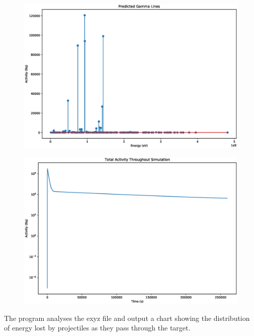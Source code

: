 \documentclass[12pt,twoside]{manual}
\begin{document}
\begin{figure}[h]
  \begin{center}
    \includegraphics[scale=0.25]{img/end_of_sim_gamma_lines.eps}
  \end{center}
\end{figure}

\begin{figure}[h]
  \begin{center}
    \includegraphics[scale=0.25]{img/total_sim_total_activity_log.eps}
  \end{center}
\end{figure}


\FloatBarrier

The program analyses the exyz file and output a chart showing the distribution of energy lost by projectiles as they pass through the target.  
\end{document}
